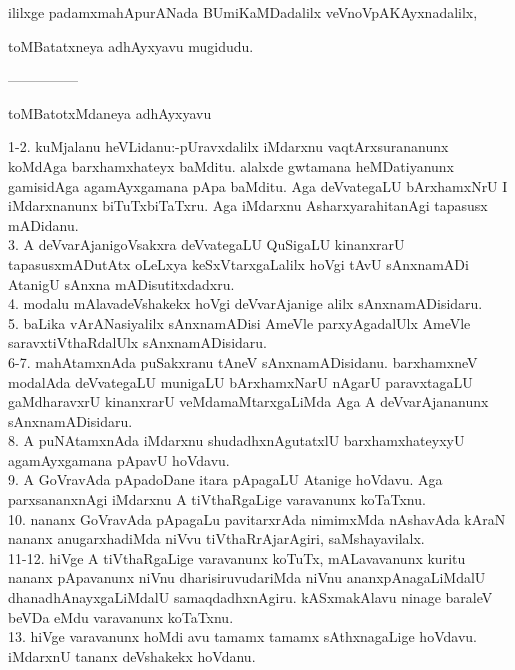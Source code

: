 \documentclass{article}
\begin{document}
\begin{center}
ililxge padamxmahApurANada BUmiKaMDadalilx veVnoVpAKAyxnadalilx,
\end{center}

\begin{center}
toMBatatxneya adhAyxyavu mugidudu.
\end{center}

\begin{center}
---------------
\end{center}

\begin{center}
toMBatotxMdaneya adhAyxyavu
\end{center}

1-2. kuMjalanu heVLidanu:-pUravxdalilx iMdarxnu vaqtArxsurananunx koMdAga barxhamxhateyx baMditu. alalxde gwtamana heMDatiyanunx gamisidAga agamAyxgamana pApa baMditu. Aga deVvategaLU bArxhamxNrU I iMdarxnanunx biTuTxbiTaTxru. Aga iMdarxnu AsharxyarahitanAgi tapasusx mADidanu.\\
3. A deVvarAjanigoVsakxra deVvategaLU QuSigaLU kinanxrarU tapasusxmADutAtx oLeLxya keSxVtarxgaLalilx hoVgi tAvU sAnxnamADi AtanigU sAnxna mADisutitxdadxru.\\
4. modalu mAlavadeVshakekx hoVgi deVvarAjanige alilx sAnxnamADisidaru.\\
5. baLika vArANasiyalilx sAnxnamADisi AmeVle parxyAgadalUlx AmeVle saravxtiVthaRdalUlx sAnxnamADisidaru.\\
6-7. mahAtamxnAda puSakxranu tAneV sAnxnamADisidanu. barxhamxneV modalAda deVvategaLU munigaLU bArxhamxNarU nAgarU paravxtagaLU gaMdharavxrU kinanxrarU veMdamaMtarxgaLiMda Aga A deVvarAjananunx sAnxnamADisidaru.\\
8. A puNAtamxnAda iMdarxnu shudadhxnAgutatxlU barxhamxhateyxyU agamAyxgamana pApavU hoVdavu.\\
9. A GoVravAda pApadoDane itara pApagaLU Atanige hoVdavu. Aga parxsananxnAgi iMdarxnu A tiVthaRgaLige varavanunx koTaTxnu.\\
10. nananx GoVravAda pApagaLu pavitarxrAda nimimxMda nAshavAda kAraN nananx anugarxhadiMda niVvu tiVthaRrAjarAgiri, saMshayavilalx.\\
11-12. hiVge A tiVthaRgaLige varavanunx koTuTx, mALavavanunx kuritu nananx pApavanunx niVnu dharisiruvudariMda niVnu ananxpAnagaLiMdalU dhanadhAnayxgaLiMdalU samaqdadhxnAgiru. kASxmakAlavu ninage baraleV beVDa eMdu varavanunx koTaTxnu.\\
13. hiVge varavanunx hoMdi avu tamamx tamamx sAthxnagaLige hoVdavu. iMdarxnU tananx deVshakekx hoVdanu.\\
\end{document}
